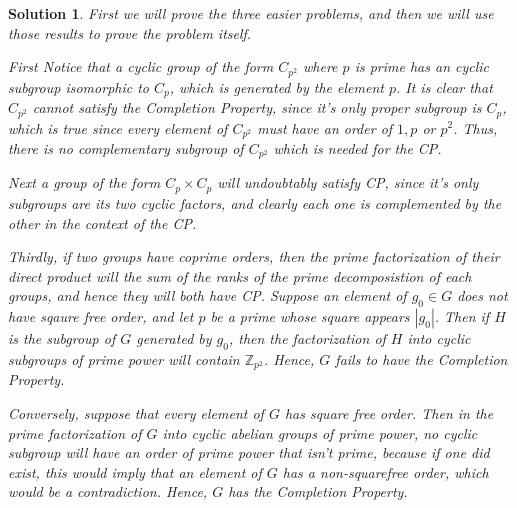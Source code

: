 \documentclass[12pt]{article}
\theoremstyle{moo}
\newtheorem*{sol}{Solution}
\def\zz{{\mathbb Z}}
\begin{document}
\begin{sol}
First we will prove the three easier problems, and then we will use those results to prove the problem itself. 

First Notice that a cyclic group of the form $C_{p^2}$ where $p$ is prime has an cyclic subgroup isomorphic to $C_{p}$, which is generated by the element $p$. It is clear that $C_{p^2}$ cannot satisfy the Completion Property, since it's only proper subgroup is $C_{p}$, which is true since every element of $C_{p^2}$ must have an order of $1,p$ or $p^2$. Thus, there is no complementary subgroup of $C_{p^2}$ which is needed for the CP. 

Next a group of the form $C_p\times C_p$ will undoubtably satisfy CP, since it's only subgroups are its two cyclic factors, and clearly each one is complemented by the other in the context of the CP.

Thirdly, if two groups have coprime orders, then the prime factorization of their direct product will the sum of the ranks of the prime decomposistion of each groups, and hence they will both have CP. Suppose an element of $g_0 \in G$ does not have sqaure free order, and let $p$ be a prime whose square appears $|g_0|$. Then if $H$ is the subgroup of $G$ generated by $g_0$, then the factorization of $H$ into cyclic subgroups of prime power will contain $\zz_{p^2}$. Hence, $G$ fails to have the Completion Property.

Conversely, suppose that every element of $G$ has square free order. Then in the prime factorization of $G$ into cyclic abelian groups of prime power, no cyclic subgroup will have an order of prime power that isn't prime, because if one did exist, this would imply that an element of $G$ has a non-squarefree order, which would be a contradiction. Hence, $G$ has the Completion Property.
\end{sol}
\end{document}

